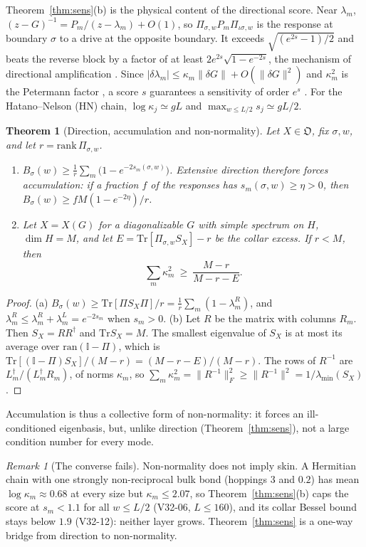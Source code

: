 \documentclass[11pt]{article}
\newtheorem{theorem}{Theorem}
\theoremstyle{definition}
\theoremstyle{remark}
\newtheorem{remark}{Remark}
\newcommand{\Tr}{\mathrm{Tr}}
\newcommand{\one}{\mathbb{I}}
\newcommand{\Obj}{\mathfrak{O}}
\newcommand{\isig}{\iota\sigma}
\begin{document}
Theorem~\ref{thm:sens}(b) is the physical content of the directional score. Near $\lambda_m$, $(z-G)^{-1}=P_m/(z-\lambda_m)+O(1)$, so $\Pi_{\sigma,w}P_m\Pi_{\isig,w}$ is the response at boundary $\sigma$ to a drive at the opposite boundary. It exceeds $\sqrt{(e^{2s}-1)/2}$ and beats the reverse block by a factor of at least $2e^{2s}\sqrt{1-e^{-2s}}$, the mechanism of directional amplification \cite{Por19,WBN20}. Since $|\delta\lambda_m|\le\kappa_m\|\delta G\|+O(\|\delta G\|^2)$ and $\kappa_m^2$ is the Petermann factor \cite{Pet79}, a score $s$ guarantees a sensitivity of order $e^{s}$ \cite{BB20}. For the Hatano--Nelson (HN) chain, $\log\kappa_j\simeq gL$ and $\max_{w\le L/2}s_j\simeq gL/2$.

\begin{theorem}[Direction, accumulation and non-normality]\label{thm:acc}
Let $X\in\Obj$, fix $\sigma,w$, and let $r=\mathrm{rank}\,\Pi_{\sigma,w}$.
\begin{enumerate}
\item[(a)] $B_\sigma(w)\ge\frac1r\sum_m\bigl(1-e^{-2s_m(\sigma,w)}\bigr)$. Extensive direction therefore forces accumulation: if a fraction $f$ of the responses has $s_m(\sigma,w)\ge\eta>0$, then $B_\sigma(w)\ge fM(1-e^{-2\eta})/r$.
\item[(b)] Let $X=X(G)$ for a diagonalizable $G$ with simple spectrum on $H$, $\dim H=M$, and let $E=\Tr[\Pi_{\sigma,w}S_X]-r$ be the collar excess. If $r<M$, then
\[
\textstyle\sum_m\kappa_m^2\ \ge\ \frac{M-r}{M-r-E}.
\]
\end{enumerate}
\end{theorem}
\begin{proof}
(a) $B_\sigma(w)\ge\Tr[\Pi S_X\Pi]/r=\frac1r\sum_m(1-\lambda^R_m)$, and $\lambda^R_m\le\lambda^R_m+\lambda^L_m=e^{-2s_m}$ when $s_m>0$.
(b) Let $R$ be the matrix with columns $R_m$. Then $S_X=RR^\dagger$ and $\Tr S_X=M$. The smallest eigenvalue of $S_X$ is at most its average over $\mathrm{ran}(\one-\Pi)$, which is $\Tr[(\one-\Pi)S_X]/(M-r)=(M-r-E)/(M-r)$. The rows of $R^{-1}$ are $L_m^\dagger/(L_m^\dagger R_m)$, of norms $\kappa_m$, so $\sum_m\kappa_m^2=\|R^{-1}\|_F^2\ge\|R^{-1}\|^2=1/\lambda_{\min}(S_X)$.
\end{proof}

Accumulation is thus a collective form of non-normality: it forces an ill-conditioned eigenbasis, but, unlike direction (Theorem~\ref{thm:sens}), not a large condition number for every mode.

\begin{remark}[The converse fails]\label{rem:converse}
Non-normality does not imply skin. A Hermitian chain with one strongly non-reciprocal bulk bond (hoppings $3$ and $0.2$) has mean $\log\kappa_m\approx0.68$ at every size but $\kappa_m\le2.07$, so Theorem~\ref{thm:sens}(b) caps the score at $s_m<1.1$ for all $w\le L/2$ (V32-06, $L\le160$), and its collar Bessel bound stays below $1.9$ (V32-12): neither layer grows. Theorem~\ref{thm:sens} is a one-way bridge from direction to non-normality.
\end{remark}
\end{document}
